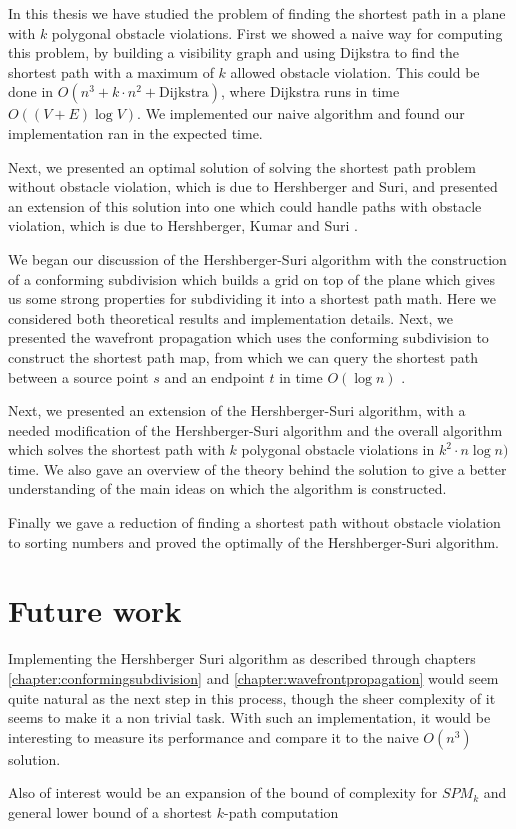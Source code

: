 In this thesis we have studied the problem of finding the shortest path in a
plane with $k$ polygonal obstacle violations. First we showed a naive way for
computing this problem, by building a visibility graph and using Dijkstra to
find the shortest path with a maximum of $k$ allowed obstacle violation. This
could be done in $O(n^3 + k \cdot n^2 + \text{Dijkstra})$, where Dijkstra runs
in time $O((V + E) \log V)$. We implemented our naive algorithm and found our
implementation ran in the expected time. 

Next, we presented an optimal solution of solving the shortest path problem without obstacle violation, 
which is due to Hershberger and Suri\cite{HershbergerS99}, and presented an extension of this solution 
into one which could handle paths with obstacle violation, which is due to Hershberger, Kumar and Suri
\cite{HershbergerKS17}. 

We began our discussion of the Hershberger-Suri algorithm with the construction of a conforming 
subdivision which builds a grid on top of the plane which gives us some strong properties for subdividing 
it into a shortest path math. Here we considered both theoretical results and implementation details. 
Next, we presented the wavefront propagation which uses the conforming subdivision to construct 
the shortest path map, from which we can query the shortest path between a source point $s$ 
and an endpoint $t$ in time $O(\log n)$ \cite{DBLP:journals/siamcomp/Kirkpatrick83}. 

Next, we presented an extension of the Hershberger-Suri algorithm, with a needed modification
of the Hershberger-Suri algorithm and the overall algorithm which solves the shortest path with
$k$ polygonal obstacle violations in $k^2 \cdot n \log n)$ time. We also gave an overview of the
theory behind the solution to give a better understanding of the main ideas on which the algorithm
is constructed.

Finally we gave a reduction of finding a shortest path without obstacle violation to sorting numbers
and proved the optimally of the Hershberger-Suri algorithm.

\newpage 

\section{Future work}

Implementing the Hershberger Suri algorithm as described through chapters
\ref{chapter:conformingsubdivision} and \ref{chapter:wavefrontpropagation}
would seem quite natural as the next step in this process, though the sheer
complexity of it seems to make it a non trivial task. With such an
implementation, it would be interesting to measure its performance and compare
it to the naive $O(n^3)$ solution.

Also of interest would be an expansion of the bound of complexity for $SPM_k$
and general lower bound of a shortest $k$-path computation

